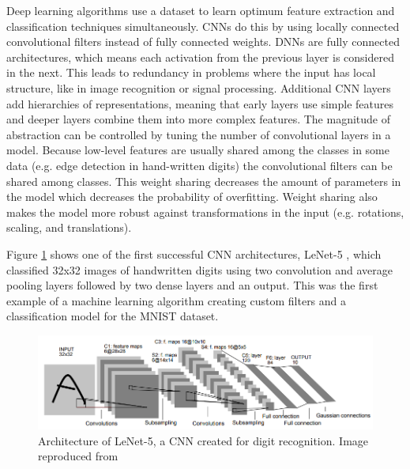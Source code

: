 Deep learning algorithms use a dataset to learn optimum feature extraction and classification techniques simultaneously. CNNs do this by using locally connected convolutional filters instead of fully connected weights. DNNs are fully connected architectures, which means each activation from the previous layer is considered in the next. This leads to redundancy in problems where the input has local structure, like in image recognition or signal processing. Additional CNN layers add hierarchies of representations, meaning that early layers use simple features and deeper layers combine them into more complex features. The magnitude of abstraction can be controlled by tuning the number of convolutional layers in a model. Because low-level features are usually shared among the classes in some data (e.g. edge detection in hand-written digits) the convolutional filters can be shared among classes. This weight sharing decreases the amount of parameters in the model which decreases the probability of overfitting. Weight sharing also makes the model more robust against transformations in the input (e.g. rotations, scaling, and translations).

Figure \ref{fig:cnn_mnist_lecun98} shows one of the first successful CNN architectures, LeNet-5 \cite{Lecun1998}, which classified 32x32 images of handwritten digits using two convolution and average pooling layers followed by two dense layers and an output. This was the first example of a machine learning algorithm creating custom filters and a classification model for the MNIST dataset.



\begin{figure}[H]
	\centering
	\includegraphics[width=0.85\linewidth]{images/cnn_mnist_lecun98}
	\caption{Architecture of LeNet-5, a CNN created for digit recognition. Image reproduced from \cite{Lecun1998}}
	\label{fig:cnn_mnist_lecun98}
\end{figure}

